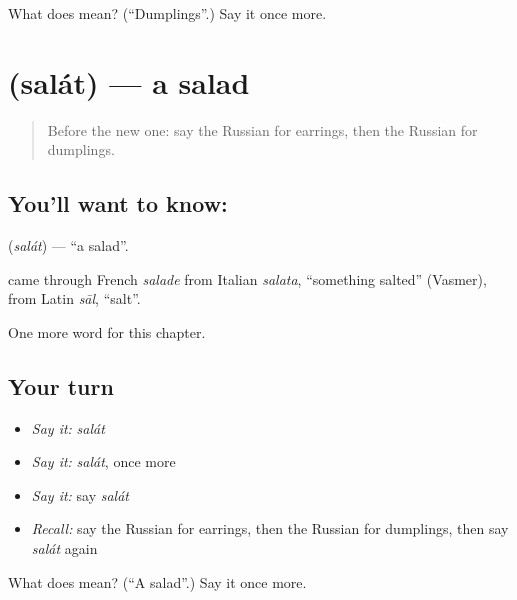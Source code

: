 \begin{tcolorbox}[breakable,colback=teal!4,colframe=teal!35!black,title={Before you move on}]
What does  mean? (\textquotedblleft{}Dumplings\textquotedblright{}.) Say it once more.
\end{tcolorbox}
\section[\texorpdfstring{\ru{салат} (salát)}{салат (salát)}]{ (salát) — a salad}

\label{lesson:RU-C194-salat}



\begin{quote}
Before the new one: say the Russian for earrings, then the Russian for dumplings.
\end{quote}

\subsection*{You'll want to know: }
\textbf{} (\emph{salát}) — \textquotedblleft{}a salad\textquotedblright{}.

\begin{cousinweb}
\textbf{} came through French \emph{salade} from Italian \emph{salata}, \textquotedblleft{}something salted\textquotedblright{} (Vasmer), from Latin \emph{sāl}, \textquotedblleft{}salt\textquotedblright{}.
\end{cousinweb}

\begin{grammarlens}[title={What you've built}]
One more word for this chapter.
\end{grammarlens}

\subsection*{Your turn}
\begin{itemize}
\raggedright
  \item \emph{Say it:} \emph{salát}
  \item \emph{Say it:} \emph{salát}, once more
  \item \emph{Say it:} say \emph{salát}
  \item \emph{Recall:} say the Russian for earrings, then the Russian for dumplings, then say \emph{salát} again
\end{itemize}

\begin{tcolorbox}[breakable,colback=teal!4,colframe=teal!35!black,title={Before you move on}]
What does  mean? (\textquotedblleft{}A salad\textquotedblright{}.) Say it once more.
\end{tcolorbox}
